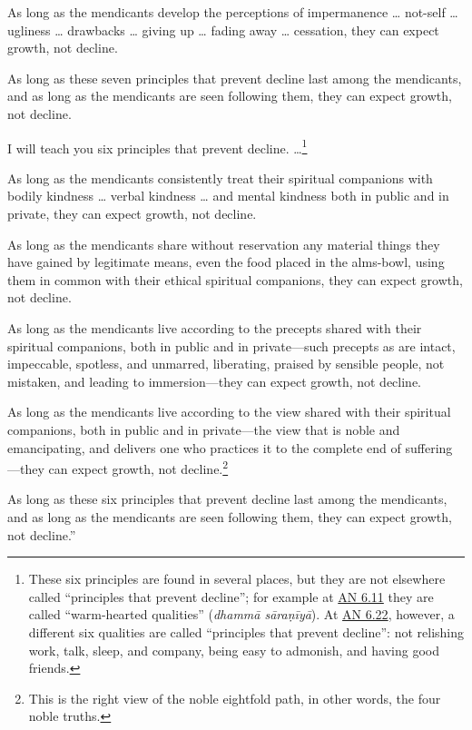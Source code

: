 \documentclass[12pt,openany]{book}%
\begin{document}
As long as the mendicants develop the perceptions of impermanence … not-self … ugliness … drawbacks … giving up … fading away … cessation, they can expect growth, not decline. 

As long as these seven principles that prevent decline last among the mendicants, and as long as the mendicants are seen following them, they can expect growth, not decline. 

I will teach you six principles that prevent decline. …\footnote{These six principles are found in several places, but they are not elsewhere called “principles that prevent decline”; for example at \href{https://suttacentral.net/an6.11/en/sujato}{AN 6.11} they are called “warm-hearted qualities” (\textit{\textsanskrit{dhammā} \textsanskrit{sāraṇīyā}}). At \href{https://suttacentral.net/an6.22/en/sujato}{AN 6.22}, however, a different six qualities are called “principles that prevent decline”: not relishing work, talk, sleep, and company, being easy to admonish, and having good friends. } 

As long as the mendicants consistently treat their spiritual companions with bodily kindness … verbal kindness … and mental kindness both in public and in private, they can expect growth, not decline. 

As long as the mendicants share without reservation any material things they have gained by legitimate means, even the food placed in the alms-bowl, using them in common with their ethical spiritual companions, they can expect growth, not decline. 

As long as the mendicants live according to the precepts shared with their spiritual companions, both in public and in private—such precepts as are intact, impeccable, spotless, and unmarred, liberating, praised by sensible people, not mistaken, and leading to immersion—they can expect growth, not decline. 

As long as the mendicants live according to the view shared with their spiritual companions, both in public and in private—the view that is noble and emancipating, and delivers one who practices it to the complete end of suffering—they can expect growth, not decline.\footnote{This is the right view of the noble eightfold path, in other words, the four noble truths. } 

As long as these six principles that prevent decline last among the mendicants, and as long as the mendicants are seen following them, they can expect growth, not decline.” 
\end{document}
